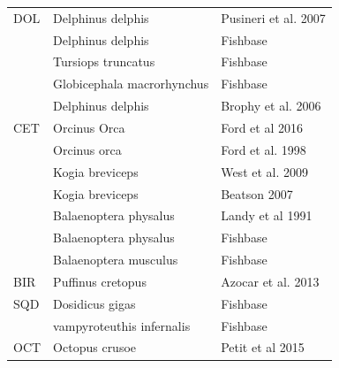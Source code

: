 \documentclass[11pt]{article}
\begin{document}
\begin{center}
\begin{tabular}{lll}
\hline
 DOL  &  Delphinus delphis           &  Pusineri et al. 2007                                                            \\
      &  Delphinus delphis           &  Fishbase                                                                        \\
      &  Tursiops truncatus          &  Fishbase                                                                        \\
      &  Globicephala macrorhynchus  &  Fishbase                                                                        \\
      &  Delphinus delphis           &  Brophy et al. 2006                                                              \\
\hline
 CET  &  Orcinus Orca                &  Ford et al 2016                                                                 \\
      &  Orcinus orca                &  Ford et al. 1998                                                                \\
      &  Kogia breviceps             &  West et al. 2009                                                                \\
      &  Kogia breviceps             &  Beatson 2007                                                                    \\
      &  Balaenoptera physalus       &  Landy et al 1991                                                                \\
      &  Balaenoptera physalus       &  Fishbase                                                                        \\
      &  Balaenoptera musculus       &  Fishbase                                                                        \\
\hline
 BIR  &  Puffinus cretopus           &  Azocar et al. 2013                                                              \\
\hline
 SQD  &  Dosidicus gigas             &  Fishbase                                                                        \\
      &  vampyroteuthis infernalis   &  Fishbase                                                                        \\
\hline
 OCT  &  Octopus crusoe              &  Petit et al 2015                                                                \\

\end{tabular}
\end{center}
\end{document}
